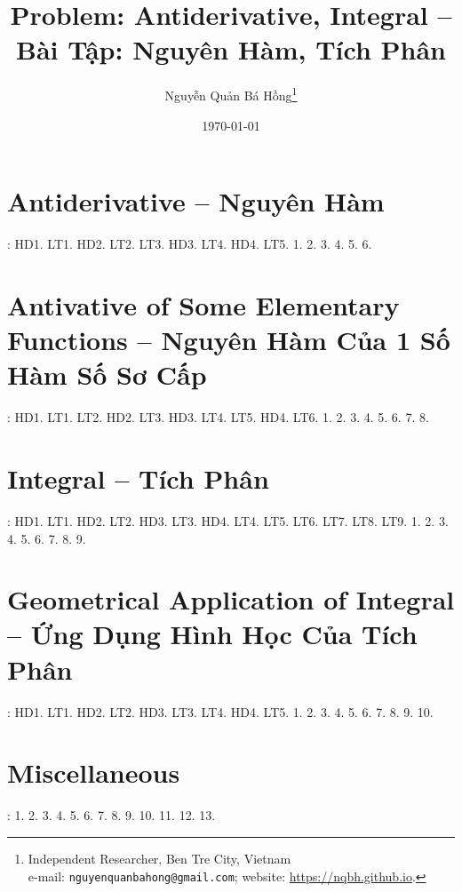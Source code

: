 \documentclass{article}
\title{Problem: Antiderivative, Integral -- Bài Tập: Nguyên Hàm, Tích Phân}
\author{Nguyễn Quản Bá Hồng\footnote{Independent Researcher, Ben Tre City, Vietnam\\e-mail: \texttt{nguyenquanbahong@gmail.com}; website: \url{https://nqbh.github.io}.}}
\date{\today}
\begin{document}
\maketitle
\tableofcontents


\section{Antiderivative -- Nguyên Hàm}
\cite[Chap. IV, \S1, pp. 3--8]{SGK_Toan_12_Canh_Dieu_tap_2}: HD1. LT1. HD2. LT2. LT3. HD3. LT4. HD4. LT5. 1. 2. 3. 4. 5. 6.


\section{Antivative of Some Elementary Functions -- Nguyên Hàm Của 1 Số Hàm Số Sơ Cấp}
\cite[Chap. IV, \S2, pp. 9--16]{SGK_Toan_12_Canh_Dieu_tap_2}: HD1. LT1. LT2. HD2. LT3. HD3. LT4. LT5. HD4. LT6. 1. 2. 3. 4. 5. 6. 7. 8.


\section{Integral -- Tích Phân}
\cite[Chap. IV, \S3, pp. 17--27]{SGK_Toan_12_Canh_Dieu_tap_2}: HD1. LT1. HD2. LT2. HD3. LT3. HD4. LT4. LT5. LT6. LT7. LT8. LT9. 1. 2. 3. 4. 5. 6. 7. 8. 9.


\section{Geometrical Application of Integral -- Ứng Dụng Hình Học Của Tích Phân}
\cite[Chap. IV, \S4, pp. 28--41]{SGK_Toan_12_Canh_Dieu_tap_2}: HD1. LT1. HD2. LT2. HD3. LT3. LT4. HD4. LT5. 1. 2. 3. 4. 5. 6. 7. 8. 9. 10.


\section{Miscellaneous}
\cite[BTCCIV, pp. 42--44]{SGK_Toan_12_Canh_Dieu_tap_2}: 1. 2. 3. 4. 5. 6. 7. 8. 9. 10. 11. 12. 13.


\printbibliography[heading=bibintoc]
	
\end{document}
